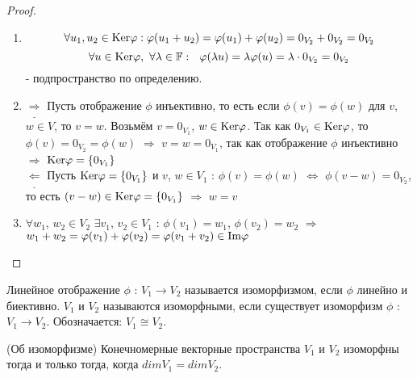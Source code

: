   \begin{proof} \tab
    \begin{enumerate}
      \item \[\forall u_1, u_2\in \textup{Ker}\phi: 
      \phi(u_1+u_2)=\phi(u_1)+\phi(u_2)=0_{V_2}+0_{V_2}=0_{V_2}\]
      \[\forall u\in \textup{Ker}\phi, \ \forall\lambda\in\F: \ \ \phi(\lambda u)=\lambda\phi(u)=\lambda\cdot 0_{V_2}=0_{V_2}\]
      - подпространство по определению.
      \item $\underline{\Longrightarrow}$ Пусть отображение $\phi$ инъективно, то есть если $\phi(v)=\phi(w)$ для $v$, $w\in V$, то $v=w$. Возьмём $v=0_{V_1}$, $w\in \textup{Ker}\phi$. Так как $0_{V_1} \in \textup{Ker}\phi$, то $\phi(v)=0_{V_2}=\phi(w)$ $\Longrightarrow$ $v=w=0_{V_1}$, так как отображение $\phi$ инъективно $\Longrightarrow$ $\textup{Ker}\phi=\{0_{V_1}\}$\\
      $\underline{\Longleftarrow}$ Пусть $\textup{Ker}\phi=\{0_{V_1}\}$ и $v$, $w\in V_1$ : $\phi(v)=\phi(w)$ $\Leftrightarrow$ $\phi(v-w)=0_{V_2}$, то есть $(v-w)\in \textup{Ker}\phi=\{0_{V_1}\}$ $\Longrightarrow$ $w=v$
      \item $\forall w_1$, $w_2\in V_2$ $\exists v_1$, $v_2\in V_1$ : $\phi(v_1)=w_1$, $\phi(v_2)=w_2$ $\Longrightarrow$ $w_1+w_2=\phi(v_1)+\phi(v_2)=\phi(v_1+v_2)\in \textup{Im}\phi$
    \end{enumerate}
  \end{proof}
  \begin{definition}
    Линейное отображение $\phi$ : $V_1 \to V_2$ называется изоморфизмом, если $\phi$ линейно и биективно. $V_1$ и $V_2$ называются изоморфными, если существует изоморфизм $\phi$ : $V_1 \to V_2$. Обозначается: $V_1 \cong V_2$.
  \end{definition}
  \begin{theorem}(Об изоморфизме)
    Конечномерные векторные пространства $V_1$ и $V_2$ изоморфны тогда и только тогда, когда $dimV_1 = dimV_2$. 
  \end{theorem}
